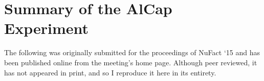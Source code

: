 \chapter{Summary of the AlCap Experiment}
The following was originally submitted for the proceedings of NuFact `15 and has been published online from the meeting's home page.
Although peer reviewed, it has not appeared in print, and so I reproduce it here in its entirety.
